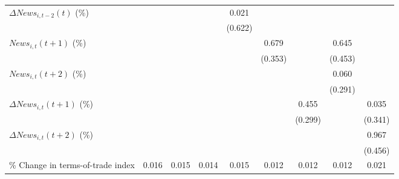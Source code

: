 {\begin{tabular}{l*{8}{c}}
\addlinespace
$ \Delta News_{i,t-2}(t)$ (\%)&                     &                     &                     &       0.021         &                     &                     &                     &                     \\
                    &                     &                     &                     &     (0.622)         &                     &                     &                     &                     \\
\addlinespace
$ News_{i,t}(t+1)$ (\%)&                     &                     &                     &                     &       0.679\sym{*}  &                     &       0.645         &                     \\
                    &                     &                     &                     &                     &     (0.353)         &                     &     (0.453)         &                     \\
\addlinespace
$ News_{i,t}(t+2)$ (\%)&                     &                     &                     &                     &                     &                     &       0.060         &                     \\
                    &                     &                     &                     &                     &                     &                     &     (0.291)         &                     \\
\addlinespace
$ \Delta News_{i,t}(t+1)$ (\%)&                     &                     &                     &                     &                     &       0.455         &                     &       0.035         \\
                    &                     &                     &                     &                     &                     &     (0.299)         &                     &     (0.341)         \\
\addlinespace
$ \Delta News_{i,t}(t+2)$ (\%)&                     &                     &                     &                     &                     &                     &                     &       0.967\sym{*}  \\
                    &                     &                     &                     &                     &                     &                     &                     &     (0.456)         \\
\addlinespace
\% Change in terms-of-trade index&       0.016         &       0.015         &       0.014         &       0.015         &       0.012         &       0.012         &       0.012         &       0.021         \\

\end{tabular}}
